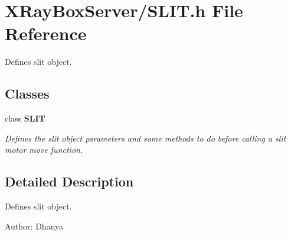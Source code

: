 \section{XRay\-Box\-Server/SLIT.h File Reference}
\label{SLIT_8h}
Defines slit object. 

\subsection*{Classes}
\begin{CompactItemize}
\item 
class \bf{SLIT}
\begin{CompactList}\small\item\em Defines the slit object parameters and some methods to do before calling a slit motor move function. \item\end{CompactList}\end{CompactItemize}


\subsection{Detailed Description}
Defines slit object. 

\begin{Desc}
\item[Author:]Dhanya \end{Desc}
